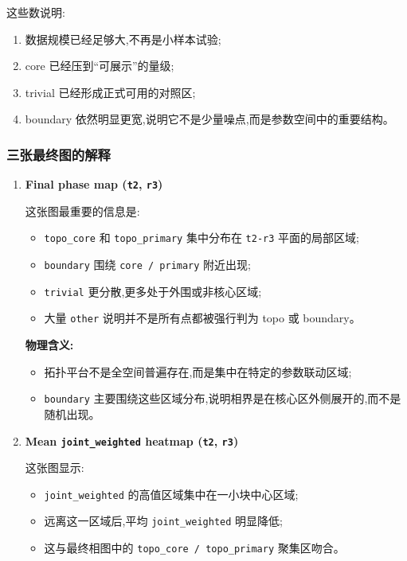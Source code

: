 \documentclass[lang=cn,scheme=chinese,color=blue,device=normal,toc=onecol,math=cm]{elegantbook}
\begin{document}
这些数说明:\par


\begin{enumerate}
\item 数据规模已经足够大,不再是小样本试验;
\item core 已经压到“可展示”的量级;
\item trivial 已经形成正式可用的对照区;
\item boundary 依然明显更宽,说明它不是少量噪点,而是参数空间中的重要结构。
\end{enumerate}


\subsubsection{三张最终图的解释}


\begin{enumerate}
\item \textbf{Final phase map (\texttt{t2}, \texttt{r3})}\par
 
这张图最重要的信息是:\par
 
\begin{itemize}
\item \texttt{topo\_\allowbreak{}core} 和 \texttt{topo\_\allowbreak{}primary} 集中分布在 \texttt{t2-r3} 平面的局部区域;
\item \texttt{boundary} 围绕 \texttt{core /\allowbreak{} primary} 附近出现;
\item \texttt{trivial} 更分散,更多处于外围或非核心区域;
\item 大量 \texttt{other} 说明并不是所有点都被强行判为 topo 或 boundary。
\end{itemize}
 
\textbf{物理含义:}\par
 
\begin{itemize}
\item 拓扑平台不是全空间普遍存在,而是集中在特定的参数联动区域;
\item \texttt{boundary} 主要围绕这些区域分布,说明相界是在核心区外侧展开的,而不是随机出现。
\end{itemize}
\item \textbf{Mean \texttt{joint\_\allowbreak{}weighted} heatmap (\texttt{t2}, \texttt{r3})}\par
 
这张图显示:\par
 
\begin{itemize}
\item \texttt{joint\_\allowbreak{}weighted} 的高值区域集中在一小块中心区域;
\item 远离这一区域后,平均 \texttt{joint\_\allowbreak{}weighted} 明显降低;
\item 这与最终相图中的 \texttt{topo\_\allowbreak{}core /\allowbreak{} topo\_\allowbreak{}primary} 聚集区吻合。
\end{itemize}
 

\end{enumerate}
\end{document}
